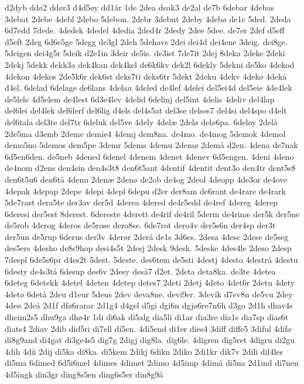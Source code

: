 d2dyb
dd^^f82
dd^^f8r3
d4d5^^f8y
dd1^^e5r
1de
2dea
deak3
de2al
de7b
6debar
4debas
3debat
2debe
4debl
2debo
5debon.
2debr
3debut
2deby
4deb^^f8
de1c
5ded.
2deda
6d7edd
7dede.
4dedek
4dedel
4dedia
2ded4r
2dedy
2dee
5dee.
de7er
2def
d5eff
d5eft
2deg
6d6e5ge
5degg
de3gl
2deh
5dehavs
2dei
dei4d
dei4ene
3deig.
dei8ge.
5deigen
dei4g5r
5deik
d2e1in
3deir
de5is.
de3ist
7de7it
2dej
8deka
2deke
2deki
2dekj
5dekk
dekk3a
dek4kan
dek4kel
de6k6kv
dek2l
6dekly
5dekni
de5ko
4dekod
4dekon
4dekos
2de5k6r
dek6st
deks7ti
deks6tr
5dekt
2deku
4dekv
4dek^^f8
4dek^^e5
d4el.
6delad
6delage
de6lans
4delau
4deled
de4lef
4delei
del5ei4d
del5eie
4de4lek
de5lele
4d5elem
de4lest
6d3e4lev
4delid
6delinj
del5int
4delis
4deliv
del4lap
del6lei
del4lek
del6lerf
del6lig
d4els
del4s5at
del3se
delses7
del4si
del4spo
d4elt
del6tala
del3te
del7tr
6deluk
del5ve
4dely
4del^^e6
2del^^f8
del^^f86pa.
6del^^f8y
2del^^e5
2de5ma
d3emb
2deme
demie4
4demj
dem8na.
de4mo.
de4mog
5demok
4demol
demo5no
5demos
dem5pe
3demr
5dems
4demu
2dem^^f8
2dem^^e5
d2en.
4dena
de7nak
6d5en6den.
de5neb
4dened
6denel
4denem
4denet
4denev
6d5engen.
4deni
4deno
de4nom
d2ens
den4sin
den4s3t8
den6t5ant
4dentif
4dentit
dent3o
den4tr
dent5s8
den6t5u6
den6t^^e5
4denu
2den^^e6
2den^^f8
de2ob
de4og
2deol
4deopp
4de3or
de4ove
4depak
4depap
2depe
4depi
4depl
6depu
d2er
der8am
de6rant
de4rare
de4rark
5de7rast
dera5te
der3av
der5d
4derea
4dered
de4r5edd
de4ref
4dereg
4derep
6deresi
der5est
8derest.
6dereste
4derett
de4rif
de4ril
5derin
de4rin^^e6
der5k
der5ne
de5rob
4derog
4deros
de5rose
dero8se.
6de7rot
dero4v
der5s6n
der4sp
der3t
der5un
de5rup
6derus
der3v
4der^^f8r
2der^^e5
de1s
3d6es.
2desa
4desc
2dese
de5seg
des5ers
4desho
de8s9hop
desi4s5t
2desj
2desk
9desk.
5deske
4des4le
2deso
2desp
7despl
6de5s6pr
d4es2t
5dest.
5deste.
des6tem
de5sti
4destj
4desto
4destr^^e5
4destu
6desty
de4s3t^^e5
6desup
des6v
2desy
des^^e57
d2et.
2deta
deta8ka.
de3te
4detea
6deteg
6detekk
4detel
4deten
4detep
detes7
2deti
2detj
4deto
4det6r
2detu
4dety
4det^^f8
6det^^e5
2deu
d1eur
5deus
2dev
deva8ne.
devi9er.
3devik
d7ev8n
de5vu
2dey
4de^^f8
2de^^e5
2d1f
df^^f86rarar
2d1g4
d4gel
d5gi
dgi6n
dgj^^f86re7n6h
d3go
2d1h
dhav4s
dheim2s5
dhu9ga
dh^^f84r
1di
di6ak
di5alg
dia5li
di1ar
dia3re
dia1s
dia7sp
dias6t
diats4
2diav
2dib
did5ri
di7ell
di5en.
4di5end
di1er
dies4
3diff
diffe5
3diful
4dif^^f8
di8g9and
di4gat
di3ge4s5
dig7g
2digj
dig8la.
dig6le.
4digren
dig5ret
4digru
di2gu
4dih
4dii
2dij
di5ka
di8ka.
di5kem
2dikj
6dikn
2diko
2di1kr
dik7v
2dili
dil4les
di5ma
6dimed
6d5i6mel
4dimes
4dimet
2dimo
4d5imp
4dim^^e5
di5na
2d1ind
di7nen
4d5ingk
din3gr
ding8s5en
ding6s5er
din8g9^^e5
